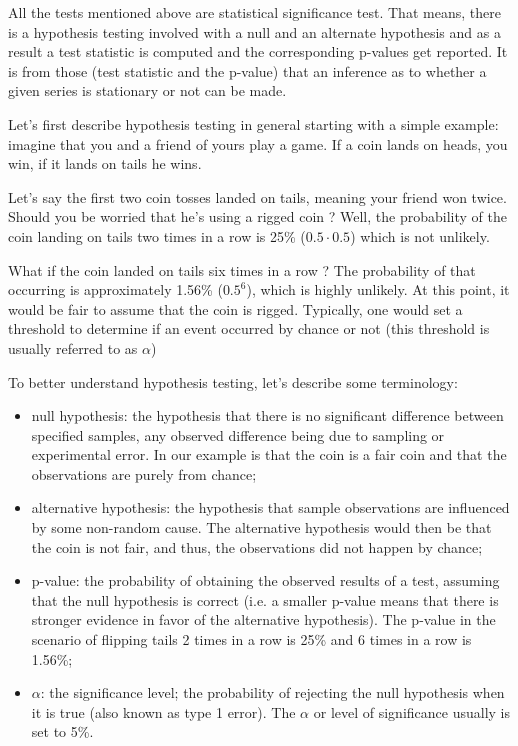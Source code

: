 All the tests mentioned above are statistical
significance test. That means, there is a hypothesis testing involved
with a null and an alternate hypothesis and as a result a test statistic
is computed and the corresponding p-values get reported.
It is from those (test statistic and the p-value) that an inference as to whether a given series is stationary or not can be made.

Let's first describe hypothesis testing in general starting
with a simple example: imagine that you and a friend of yours play
a game. If a coin lands on heads, you win, if it lands on tails he wins.

Let's say the first two coin tosses landed on tails, meaning your friend
won twice. Should you be worried that he's using a rigged coin ? Well,
the probability of the coin landing on tails two times in a row is 25\%
($0.5\cdot 0.5$) which is not unlikely. 

What if the coin landed on tails six times in a row ? 
The probability of that occurring is approximately
1.56\% (\(0.5^6\)), which is highly unlikely. At this point, it would be
fair to assume that the coin is rigged. Typically, one would set a
threshold to determine if an event occurred by chance or
not (this threshold is usually referred to as \(\alpha\))

To better understand hypothesis testing, let's describe some terminology:

\begin{itemize}
\tightlist
\item
  null hypothesis: the hypothesis that there is no significant
  difference between specified samples, any observed difference being
  due to sampling or experimental error. In our example is that the coin
  is a fair coin and that the observations are purely from chance;
\item
  alternative hypothesis: the hypothesis that sample observations are
  influenced by some non-random cause. The alternative hypothesis would
  then be that the coin is not fair, and thus, the observations did not
  happen by chance;
\item
  p-value: the probability of obtaining the observed results of a test,
  assuming that the null hypothesis is correct (i.e. a smaller p-value
  means that there is stronger evidence in favor of the alternative
  hypothesis). The p-value in the scenario of flipping tails 2 times in
  a row is 25\% and 6 times in a row is 1.56\%;
\item
  \(\alpha\): the significance level; the probability of rejecting the
  null hypothesis when it is true (also known as type 1 error). The
  \(\alpha\) or level of significance usually is set to 5\%.
\end{itemize}

